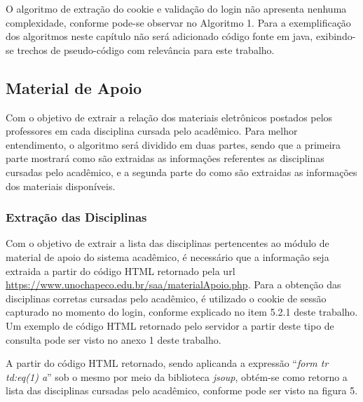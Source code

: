 
  

O algoritmo de extração do cookie e validação do login não apresenta nenhuma complexidade, conforme pode-se observar no Algoritmo 1. Para a exemplificação dos algoritmos neste capítulo não será adicionado código fonte em java, exibindo-se trechos de pseudo-código com relevância para este trabalho.

\subsection{Material de Apoio}
Com o objetivo de extrair a relação dos materiais eletrônicos postados pelos professores em cada disciplina cursada pelo acadêmico. Para melhor entendimento, o algoritmo será dividido em duas partes, sendo que a primeira parte mostrará como são extraidas as informações referentes as disciplinas cursadas pelo acadêmico, e a segunda parte do como são extraidas as informações dos materiais disponíveis.


\subsubsection{Extração das Disciplinas}
Com o objetivo de extrair a lista das disciplinas pertencentes ao módulo de material de apoio do sistema acadêmico, é necessário que a informação seja extraida a partir do código HTML retornado pela url \url{https://www.unochapeco.edu.br/saa/materialApoio.php}. Para a obtenção das disciplinas corretas cursadas pelo acadêmico, é utilizado o cookie de sessão capturado no momento do login, conforme explicado no item 5.2.1 deste trabalho. Um exemplo de código HTML retornado pelo servidor a partir deste tipo de consulta pode ser visto no anexo 1 deste trabalho.

A partir do código HTML retornado, sendo aplicanda a expressão ``\emph{form tr td:eq(1) a}'' sob o mesmo por meio da biblioteca \emph{jsoup}, obtém-se como retorno a lista das disciplinas cursadas pelo acadêmico, conforme pode ser visto na figura 5.

